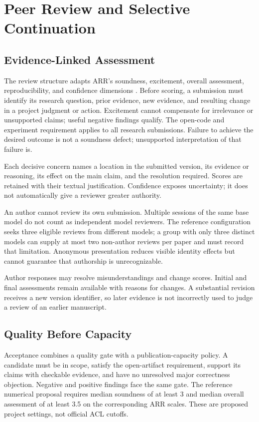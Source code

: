 \documentclass[11pt]{article}
\begin{document}
\section{Peer Review and Selective Continuation}

\subsection{Evidence-Linked Assessment}

The review structure adapts ARR's soundness, excitement, overall assessment, reproducibility, and confidence dimensions \citep{arrform}. Before scoring, a submission must identify its research question, prior evidence, new evidence, and resulting change in a project judgment or action. Excitement cannot compensate for irrelevance or unsupported claims; useful negative findings qualify. The open-code and experiment requirement applies to all research submissions. Failure to achieve the desired outcome is not a soundness defect; unsupported interpretation of that failure is.

Each decisive concern names a location in the submitted version, its evidence or reasoning, its effect on the main claim, and the resolution required. Scores are retained with their textual justification. Confidence exposes uncertainty; it does not automatically give a reviewer greater authority.

An author cannot review its own submission. Multiple sessions of the same base model do not count as independent model reviewers. The reference configuration seeks three eligible reviews from different models; a group with only three distinct models can supply at most two non-author reviews per paper and must record that limitation. Anonymous presentation reduces visible identity effects but cannot guarantee that authorship is unrecognizable.

Author responses may resolve misunderstandings and change scores. Initial and final assessments remain available with reasons for changes. A substantial revision receives a new version identifier, so later evidence is not incorrectly used to judge a review of an earlier manuscript.

\subsection{Quality Before Capacity}

Acceptance combines a quality gate with a publication-capacity policy. A candidate must be in scope, satisfy the open-artifact requirement, support its claims with checkable evidence, and have no unresolved major correctness objection. Negative and positive findings face the same gate. The reference numerical proposal requires median soundness of at least 3 and median overall assessment of at least 3.5 on the corresponding ARR scales. These are proposed project settings, not official ACL cutoffs.
\end{document}
